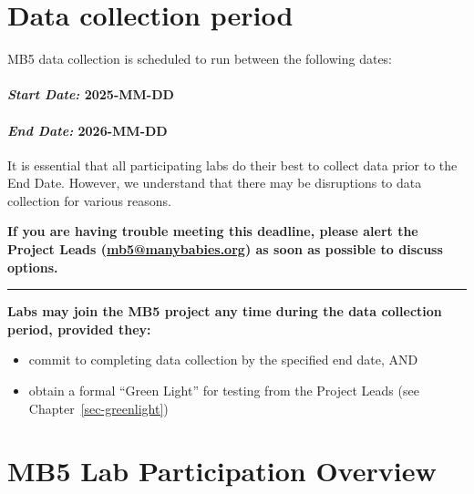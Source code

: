 \documentclass[
  letterpaper,
  DIV=11,
  numbers=noendperiod,
  oneside]{scrreprt}
\providecommand{\tightlist}{%
  \setlength{\itemsep}{0pt}\setlength{\parskip}{0pt}}
\begin{document}
\chapter{Data collection period}\label{sec-testdates}

MB5 data collection is scheduled to run between the following dates:

\subsubsection*{\texorpdfstring{\emph{Start Date:}
\textbf{2025-MM-DD}}{Start Date: 2025-MM-DD}}\label{start-date-2025-mm-dd}

\subsubsection*{\texorpdfstring{\emph{End Date:}
\textbf{2026-MM-DD}}{End Date: 2026-MM-DD}}\label{end-date-2026-mm-dd}

It is essential that all participating labs do their best to collect
data prior to the End Date. However, we understand that there may be
disruptions to data collection for various reasons.

\textbf{If you are having trouble meeting this deadline, please alert
the Project Leads
(}\href{mailto:mb5@manybabies.org}{\textbf{mb5@manybabies.org}}\textbf{)
as soon as possible to discuss options.}

\begin{center}\rule{0.5\linewidth}{0.5pt}\end{center}

\textbf{Labs may join the MB5 project any time during the data
collection period, provided they:}

\begin{itemize}
\tightlist
\item
  commit to completing data collection by the specified end date, AND
\item
  obtain a formal ``Green Light'' for testing from the Project Leads
  (see Chapter~\ref{sec-greenlight})
\end{itemize}

\chapter{MB5 Lab Participation Overview}\label{sec-laboverview}
\end{document}
